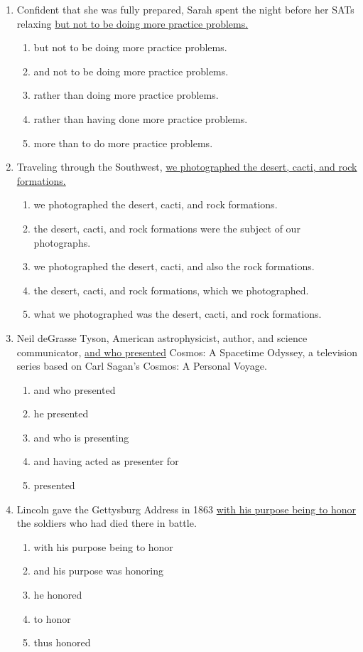 \begin{enumerate}
\bigskip
\item Confident that she was fully prepared, Sarah spent the night before her SATs relaxing \underline{but not to be doing more practice problems.}
\begin{enumerate}[label=(\Alph*)]
\item but not to be doing more practice problems.
\item and not to be doing more practice problems.
\item rather than doing more practice problems. 
\item rather than having done more practice problems.
\item more than to do more practice problems.
\end{enumerate}

\bigskip
\item Traveling through the Southwest, \underline{we photographed the desert, cacti, and rock formations.}
\begin{enumerate}[label=(\Alph*)]
\item we photographed the desert, cacti, and rock formations.
\item the desert, cacti, and rock formations were the subject of our photographs.
\item we photographed the desert, cacti, and also the rock formations.
\item the desert, cacti, and rock formations, which we photographed.
\item what we photographed was the desert, cacti, and rock formations.
\end{enumerate}

\newpage
\item Neil deGrasse Tyson, American astrophysicist, author, and science communicator, \ul{and who presented} Cosmos: A Spacetime Odyssey, a television series based on Carl Sagan's Cosmos: A Personal Voyage.
\begin{enumerate}[label=(\Alph*)]
\item and who presented
\item he presented
\item and who is presenting
\item and having acted as presenter for
\item presented
\end{enumerate}

\bigskip
\item Lincoln gave the Gettysburg Address in 1863 \underline{with his purpose being to honor} the soldiers who had died there in battle.
\begin{enumerate}[label=(\Alph*)]
\item with his purpose being to honor
\item and his purpose was honoring
\item he honored
\item to honor
\item thus honored
\end{enumerate}


\end{enumerate}
